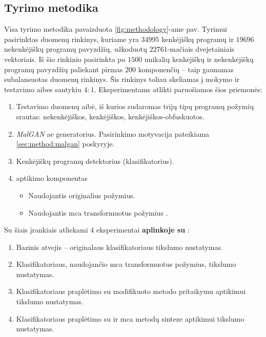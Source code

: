 
\subsection{Tyrimo metodika}

Visa tyrimo metodika pavaizduota \ref{fig:methodology}-ame pav. Tyrimui pasirinktas \SLEIPNIR \cite{al-dujailiAdversarialDeepLearning2018} duomenų rinkinys, kuriame yra $34995$ kenkėjiškų programų ir $19696$ nekenkėjiškų programų pavyzdžių, užkoduotų $22761$-mačiais dvejetainiais vektoriais. Iš šio rinkinio pasirinkta po $1500$ unikalių kenkėjiškų ir nekenkėjiškų programų pavyzdžių paliekant pirmas $200$ komponenčių -- taip gaunamas subalansuotas duomenų rinkinys. Šis rinkinys toliau skeliamas į mokymo ir testavimo aibes santykiu $4:1$.
Eksperimentams atlikti paruošiamos šios priemonės:
\begin{enumerate}
    \item Testavimo duomenų aibė, iš kurios sudaromas trijų tipų programų požymių srautas: nekenkėjiškos, kenkėjiškos, kenkėjiškos-obfuskuotos.
    \item \textit{MalGAN} \cite{huGeneratingAdversarialMalware2017} \gls{ae} generatorius. Pasirinkimo motyvacija pateikiama \ref{sec:method:malgan} poskyryje.
    \item Kenkėjiškų programų detektorius (klasifikatorius).
    \item {} aptikimo komponentas
    \begin{itemize}
        \item Naudojantis originalius požymius.
        \item Naudojantis \gls{mca} transformuotus požymius .
    \end{itemize}
\end{enumerate}

\noindent
Su šiais įrankiais atliekami 4 eksperimentai \textbf{aplinkoje su }:
    \begin{enumerate}
        \item Bazinis atvejis -- originalaus klasifikatoriaus tikslumo nustatymas.
        \item Klasifikatoriaus, naudojančio \gls{mca} transformuotus požymius, tikslumo nustatymas.
        \item Klasifikatoriaus praplėtimo su modifikuoto \LIME metodo pritaikymu  aptikimui tikslumo nustatymas.
        \item Klasifikatoriaus praplėtimo su \LIME ir \gls{mca} metodų sinteze  aptikimui tikslumo nustatymas.
    \end{enumerate}

